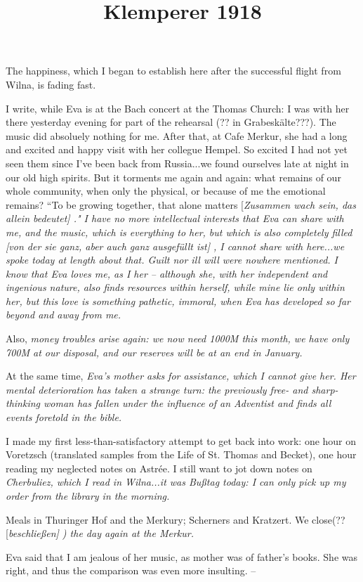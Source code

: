 \documentclass{article}
\title{Klemperer 1918}
\newcommand{\WTF}[1]{
[\it{\small{#1}}]
}
\begin{document}

The happiness, which I began to establish here after the successful flight from Wilna, is fading fast.

I write, while Eva is at the Bach concert at the Thomas Church: I was with her there yesterday evening for part of the rehearsal (?? in Grabeskälte???). The music did absoluely nothing for me. After that, at Cafe Merkur, she had a long and excited and happy visit with her collegue Hempel. So excited I had not yet seen them since I've been back from Russia...we found ourselves late at night in our old high spirits. But it torments me again and again: what remains of our whole community, when only the physical, or because of me the emotional remains? “To be growing together, that alone matters\WTF{Zusammen wach sein, das allein bedeutet}." I have no more intellectual interests that Eva can share with me, and the music, which is everything to her, but which is also completely filled\WTF{von der sie ganz, aber auch ganz ausgefüllt ist}, I cannot share with here...we spoke today at length about that. Guilt nor ill will were nowhere mentioned. I know that Eva loves me, as I her -- although she, with her independent and ingenious nature, also finds resources within herself, while mine lie only within her, but this love is something pathetic, immoral, when Eva has developed so far beyond and away from me.

Also, \it{money troubles} arise again: we now need 1000M this month, we have only 700M at our disposal, and our reserves will be at an end in January.

At the same time, \it{Eva's mother} asks for assistance, which I cannot give her. Her mental deterioration has taken a strange turn: the previously free- and sharp-thinking woman has fallen under the influence of an Adventist and finds all events foretold in the bible.

I made my first less-than-satisfactory attempt to get back into work: one hour on Voretzsch (translated samples from the Life of St. Thomas and Becket), one hour reading my neglected notes on Astrée. I still want to jot down notes on \it{Cherbuliez}, which I read in Wilna...it was Bußtag today: I can only pick up my order from the library in the morning.

Meals in Thuringer Hof and the Merkury; Scherners and Kratzert. We close(??\WTF{beschließen}) the day again at the Merkur.

Eva said that I am jealous of her music, as mother was of father's books. She was right, and thus the comparison was even more insulting. --
\end{document}
